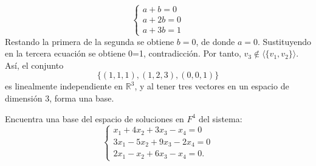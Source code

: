 \documentclass[12pt,a4paper]{article}
\begin{document}
\begin{solucion}
\begin{equation*}
\begin{cases}
                a+b=0\\
                a+2b=0\\
                a+3b=1
            \end{cases}
        \end{equation*}
        Restando la primera de la segunda se obtiene $b=0$, de donde $a=0$. Sustituyendo en
        la tercera ecuación se obtiene 0=1, contradicción. Por tanto, $v_{3}\notin\langle\{ v_{1},v_{2}\}\rangle$.
        Así, el conjunto
        \begin{equation*}
            \{(1,1,1),(1,2,3),(0,0,1)\}
        \end{equation*}
        es linealmente independiente en $\mathbb{R}^{3}$, y al tener tres vectores en un espacio
        de dimensión 3, forma una base.
    \end{solucion}

    \begin{mdframed}[style=mdbluebox,frametitle={Ejercicio 2}]
        Encuentra una base del espacio de soluciones en $F^{4}$ del sistema:
        \begin{equation*}
            \begin{cases}
                x_{1}+4x_{2}+3x_{3}-x_{4}=0\\
                3x_{1}-5x_{2}+9x_{3}-2x_{4}=0\\
                2x_{1}-x_{2}+6x_{3}-x_{4}=0.
            \end{cases}
        \end{equation*}
    \end{mdframed}
\end{document}
